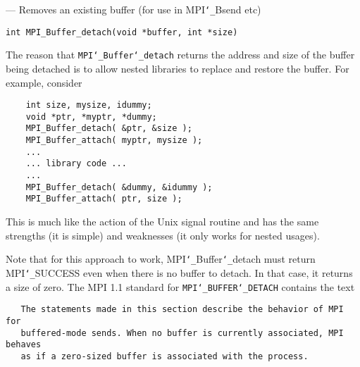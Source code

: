 \startmanpage
{}
--- Removes an existing buffer (for use in MPI{\tt \char`\_}Bsend etc) 
\startvb\begin{verbatim}
int MPI_Buffer_detach(void *buffer, int *size)

\end{verbatim}
\endvb

\par
{}
The reason that {\tt MPI{\tt \char`\_}Buffer{\tt \char`\_}detach} returns the address and size of the
buffer being detached is to allow nested libraries to replace and restore
the buffer.  For example, consider
\par
\begin{verbatim}
    int size, mysize, idummy;
    void *ptr, *myptr, *dummy;     
    MPI_Buffer_detach( &ptr, &size );
    MPI_Buffer_attach( myptr, mysize );
    ...
    ... library code ...
    ...
    MPI_Buffer_detach( &dummy, &idummy );
    MPI_Buffer_attach( ptr, size );
\end{verbatim}

\par
This is much like the action of the Unix signal routine and has the same
strengths (it is simple) and weaknesses (it only works for nested usages).
\par
Note that for this approach to work, MPI{\tt \char`\_}Buffer{\tt \char`\_}detach must return MPI{\tt \char`\_}SUCCESS
even when there is no buffer to detach.  In that case, it returns a size of
zero.  The MPI 1.1 standard for {\tt MPI{\tt \char`\_}BUFFER{\tt \char`\_}DETACH} contains the text
\par
\begin{verbatim}
   The statements made in this section describe the behavior of MPI for
   buffered-mode sends. When no buffer is currently associated, MPI behaves 
   as if a zero-sized buffer is associated with the process.
\end{verbatim}

